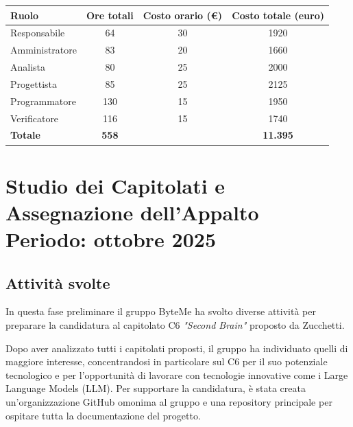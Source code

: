 \documentclass[11pt,a4paper]{article}
\begin{document}
\begin{center}
    \begin{tabular}{|l|c|c|c|}
        \hline
        \textbf{Ruolo} & \textbf{Ore totali} & \textbf{Costo orario (€)} & \textbf{Costo totale (euro)} \\
        \hline
        Responsabile & 64 & 30 & 1920 \\
        \hline
        Amministratore & 83 & 20 & 1660 \\
        \hline
        Analista & 80 & 25 & 2000 \\
        \hline
        Progettista & 85 & 25 & 2125 \\
        \hline
        Programmatore & 130 & 15 & 1950 \\
        \hline
        Verificatore & 116 & 15 & 1740 \\
        \hline
        \textbf{Totale} & \textbf{558} & & \textbf{11.395} \\
        \hline
    \end{tabular}
\end{center}

\newpage

\section{Studio dei Capitolati e Assegnazione dell'Appalto \\ \small\textbf{Periodo: ottobre 2025}}

\subsection{Attività svolte}
In questa fase preliminare il gruppo ByteMe ha svolto diverse attività per preparare la candidatura al capitolato C6 \textit{"Second Brain"} proposto da Zucchetti.

Dopo aver analizzato tutti i capitolati proposti, il gruppo ha individuato quelli di maggiore interesse, concentrandosi in particolare sul C6 per il suo potenziale tecnologico e per l'opportunità di lavorare con tecnologie innovative come i Large Language Models (LLM). Per supportare la candidatura, è stata creata un'organizzazione GitHub omonima al gruppo e una repository principale per ospitare tutta la documentazione del progetto.
\end{document}
